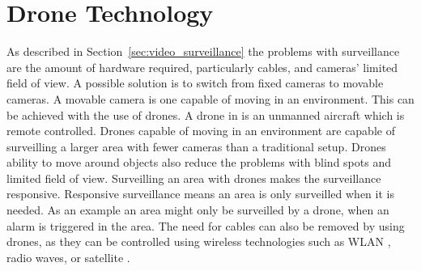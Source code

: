 \section{Drone Technology}
As described in Section~\ref{sec:video_surveillance} the problems with surveillance are the amount of hardware required, particularly cables, and cameras' limited field of view.
A possible solution is to switch from fixed cameras to movable cameras.
A movable camera is one capable of moving in an environment.
This can be achieved with the use of drones.
A drone in \projectname{} is an unmanned aircraft which is remote controlled.
Drones capable of moving in an environment are capable of surveilling a larger area with fewer cameras than a traditional setup.
Drones ability to move around objects also reduce the problems with blind spots and limited field of view.
Surveilling an area with drones makes the surveillance responsive.
Responsive surveillance means an area is only surveilled when it is needed.
As an example an area might only be surveilled by a drone, when an alarm is triggered in the area.
The need for cables can also be removed by using drones, as they can be controlled using wireless technologies such as WLAN \citep{ardrone_developer_guide}, radio waves, or satellite \citep{drone_freq}.
